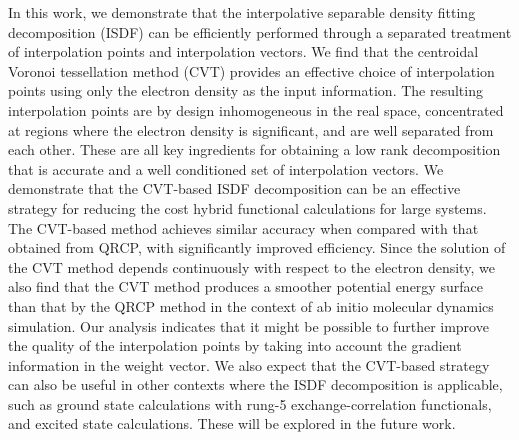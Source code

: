 In this work, we demonstrate that the interpolative separable density fitting
decomposition (ISDF) can be efficiently performed through a separated treatment
of interpolation points and interpolation vectors. We find that the centroidal
Voronoi tessellation method (CVT) provides an effective choice of interpolation
points using only the electron density as the input information. The resulting
interpolation points are by design inhomogeneous in the real space, concentrated
at regions where the electron density is significant, and are well separated
from each other. These are all key ingredients for obtaining a low rank
decomposition that is accurate and a well conditioned set of interpolation
vectors. We demonstrate that the CVT\hyp{}based ISDF decomposition can be an
effective strategy for reducing the cost hybrid functional calculations for
large systems. The CVT\hyp{}based method achieves similar accuracy when compared
with that obtained from QRCP, with significantly improved efficiency. Since the
solution of the CVT method depends continuously with respect to the electron
density, we also find that the CVT method produces a smoother potential energy
surface than that by the QRCP method in the context of ab initio molecular
dynamics simulation. Our analysis indicates that it might be possible to further
improve the quality of the interpolation points by taking into account the
gradient information in the weight vector. We also expect that the 
CVT\hyp{}based strategy can also be useful in other contexts where the ISDF
decomposition is applicable, such as ground state calculations with rung\hyp{}5
exchange\hyp{}correlation functionals, and excited state calculations. These
will be explored in the future work.